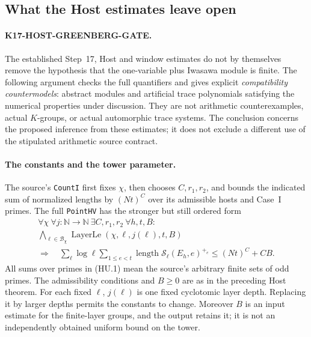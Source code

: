 \documentclass[11pt,a4paper]{article}
\theoremstyle{definition}
\begin{document}
\subsection{What the Host estimates leave open}
\label{sec:host-uniformity-gate}

\paragraph{K17-HOST-GREENBERG-GATE.}
The established Step~17, Host and window estimates do not by themselves
remove the hypothesis that the one-variable plus Iwasawa module is
finite.  The following argument checks the full quantifiers and gives
explicit \emph{compatibility countermodels}: abstract modules and
artificial trace polynomials satisfying the numerical properties under
discussion.  They are not arithmetic counterexamples, actual
$K$-groups, or actual automorphic trace systems.  The conclusion
concerns the proposed inference from these estimates; it does not
exclude a different use of the stipulated arithmetic source contract.

\paragraph{The constants and the tower parameter.}
The source's \texttt{CountI} first fixes $\chi$, then chooses
$C,r_1,r_2$, and bounds the indicated sum of normalized lengths by
$(Nt)^C$ over its admissible hosts and Case~I primes.
The full \texttt{PointHV} has the stronger but still ordered form
\[
 \begin{gathered}
 \forall\chi\ \forall j:\mathbb N\longrightarrow\mathbb N\
 \exists C,r_1,r_2\ \forall h,t,B:\\
 \bigwedge_{\ell\in\mathcal B_\chi}
     \operatorname{LayerLe}(\chi,\ell,j(\ell),t,B)\\
 \Longrightarrow\quad
 \sum_{\ell}\log\ell\sum_{1\le e<t}
       \operatorname{length}\mathcal S_\ell(E_h,e)^{+_e}
       \le (Nt)^C+CB.
 \end{gathered}
 \tag{HU.1}
\]
All sums over primes in (HU.1) mean the source's arbitrary finite sets
of odd primes.  The admissibility conditions and $B\ge0$ are as in the preceding
Host theorem.  For each fixed $\ell$, $j(\ell)$ is one fixed
cyclotomic layer depth.  Replacing it by larger depths permits the
constants to change.  Moreover $B$ is an input estimate for the
finite-layer groups, and the output retains it; it is not an
independently obtained uniform bound on the tower.
\end{document}
